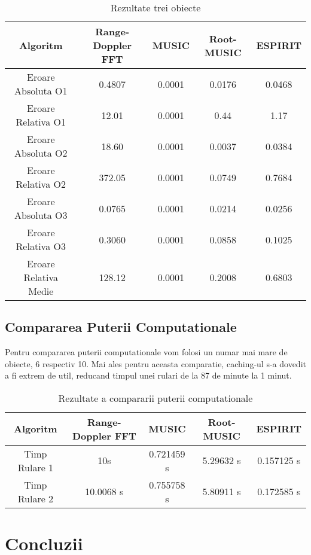 \documentclass{article}
\begin{document}
\begin{table}[h]
	\centering
	\begin{tabular}{|c|c|c|c|c|}
		\hline
		Algoritm & Range-Doppler FFT & MUSIC & Root-MUSIC & ESPIRIT \\
		\hline
		Eroare Absoluta O1 & 0.4807 & \text{\textless} 0.0001 & 0.0176 & 0.0468 \\
		\hline
		Eroare Relativa O1 & 12.01 & \text{\textless} 0.0001 & 0.44 & 1.17\\
		\hline
		Eroare Absoluta O2 & 18.60 & \text{\textless} 0.0001 & 0.0037 &  0.0384 \\
		\hline
		Eroare Relativa O2 & 372.05 & \text{\textless} 0.0001 & 0.0749 & 0.7684 \\
		\hline
		Eroare Absoluta O3 & 0.0765 & \text{\textless} 0.0001 & 0.0214 & 0.0256 \\
		\hline
		Eroare Relativa O3 & 0.3060 & \text{\textless} 0.0001 & 0.0858 & 0.1025 \\
		\hline
		Eroare Relativa Medie & 128.12 & \text{\textless} 0.0001 & 0.2008 & 0.6803 \\
		\hline
	\end{tabular}
	\caption{Rezultate trei obiecte}
\end{table}

\subsection{Compararea Puterii Computationale}

Pentru compararea puterii computationale vom folosi un numar mai mare de obiecte, 6 respectiv 10.
Mai ales pentru aceasta comparatie, caching-ul s-a dovedit a fi extrem de util, reducand timpul unei rulari de la 87 de minute la 1 minut.

\begin{table}[h]
	\centeriin
	\begin{tabular}{|c|c|c|c|c|}
		\hline
		Algoritm & Range-Doppler FFT & MUSIC & Root-MUSIC & ESPIRIT \\
		\hline
		Timp Rulare 1 & 10s & 0.721459 s & 5.29632 s & 0.157125 s \\
		\hline
		Timp Rulare 2 & 10.0068 s & 0.755758 s & 5.80911 s & 0.172585 s \\
		\hline
	\end{tabular}
	\caption{Rezultate a compararii puterii computationale}
\end{table}

\section{Concluzii}
\end{document}
